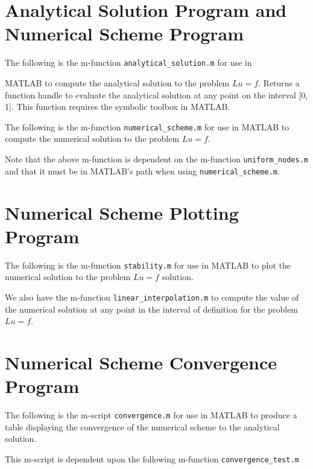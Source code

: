 \documentclass{article}
\begin{document}
\newpage
\begin{appendices}
  \section{Analytical Solution Program and Numerical Scheme Program}\label{append_analytical}
  The following is the m-function \texttt{analytical\_solution.m} for use in

  MATLAB to compute the analytical solution to the problem $Lu = f$. Returns
  a function handle to evaluate the analytical solution at any point on the
  interval [0, 1]. This function requires the symbolic toolbox in MATLAB.
  

  The following is the m-function \texttt{numerical\_scheme.m} for use in MATLAB
  to compute the numerical solution to the problem $Lu = f$.
  

  Note that the above m-function is dependent on the m-function
  \texttt{uniform\_nodes.m} and that it must be in MATLAB's path when using
  \texttt{numerical\_scheme.m}.
  

  \section{Numerical Scheme Plotting Program}\label{append_plot}
  The following is the m-function \texttt{stability.m} for use in MATLAB to
  plot the numerical solution to the problem $Lu=f$
  solution.
  

  We also have the m-function \texttt{linear\_interpolation.m} to compute
  the value of the numerical solution at any point in the interval of definition
  for the problem $Lu =f$.
  

  \section{Numerical Scheme Convergence Program}\label{append_convergence}
  The following is the m-script \texttt{convergence.m} for use in MATLAB to
  produce a table displaying the convergence of the numerical scheme to the analytical
  solution.
  

  This m-script is dependent upon the following m-function \texttt{convergence\_test.m}
  


\end{appendices}
\end{document}
